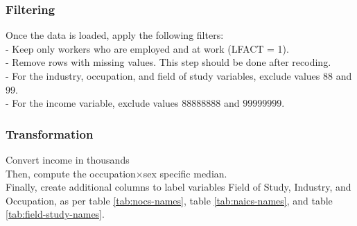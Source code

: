 \documentclass[12pt]{article}
\begin{document}
\subsubsection*{Filtering}
Once the data is loaded, apply the following filters:\\
- Keep only workers who are employed and at work (LFACT = 1).\\
- Remove rows with missing values. This step should be done after recoding.\\
- For the industry, occupation, and field of study variables, exclude values 88 and 99.\\
- For the income variable, exclude values $88888888$ and $99999999$.\\

\subsubsection*{Transformation}
Convert income in thousands\\
Then, compute the occupation$\times$sex specific median.\\
Finally, create additional columns to label variables Field of Study, Industry, and Occupation, as per table \ref{tab:nocs-names}, table \ref{tab:naics-names}, and table \ref{tab:field-study-names}.
\end{document}
